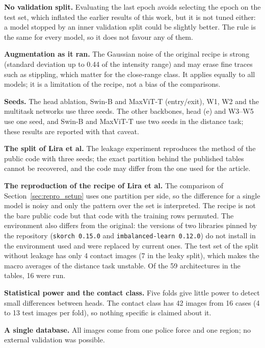 \textbf{No validation split.} Evaluating the last epoch avoids selecting the epoch on the test set, which inflated the earlier results of this work, but it is not tuned either: a model stopped by an inner validation split could be slightly better. The rule is the same for every model, so it does not favour any of them.

\textbf{Augmentation as it ran.} The Gaussian noise of the original recipe is strong (standard deviation up to 0.44 of the intensity range) and may erase fine traces such as stippling, which matter for the close-range class. It applies equally to all models; it is a limitation of the recipe, not a bias of the comparisons.

\textbf{Seeds.} The head ablation, Swin-B and MaxViT-T (entry/exit), W1, W2 and the multitask networks use three seeds. The other backbones, head (e) and W3--W5 use one seed, and Swin-B and MaxViT-T use two seeds in the distance task; these results are reported with that caveat.

\textbf{The split of Lira et al.} The leakage experiment reproduces the method of the public code with three seeds; the exact partition behind the published tables cannot be recovered, and the code may differ from the one used for the article.

\textbf{The reproduction of the recipe of Lira et al.} The comparison of Section~\ref{sec:repro_setup} uses one partition per side, so the difference for a single model is noisy and only the pattern over the set is interpreted. The recipe is not the bare public code but that code with the training rows permuted. The environment also differs from the original: the versions of two libraries pinned by the repository (\texttt{skorch 0.15.0} and \texttt{imbalanced-learn 0.12.0}) do not install in the environment used and were replaced by current ones. The test set of the split without leakage has only 4 contact images (7 in the leaky split), which makes the macro averages of the distance task unstable. Of the 59 architectures in the tables, 16 were run.

\textbf{Statistical power and the contact class.} Five folds give little power to detect small differences between heads. The contact class has 42 images from 16 cases (4 to 13 test images per fold), so nothing specific is claimed about it.

\textbf{A single database.} All images come from one police force and one region; no external validation was possible.
